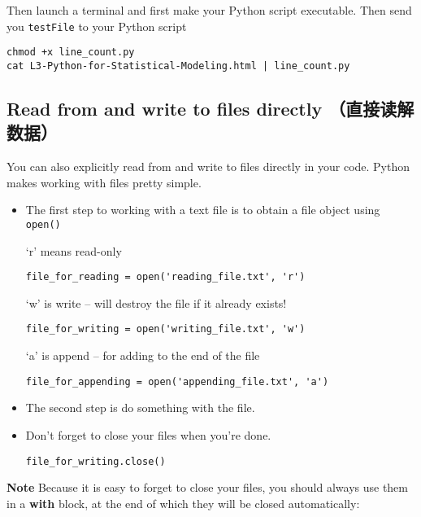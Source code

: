 \documentclass{article}
\begin{document}
    Then launch a terminal and first make your Python script executable.
Then send you \texttt{testFile} to your Python script

\begin{verbatim}
chmod +x line_count.py
cat L3-Python-for-Statistical-Modeling.html | line_count.py
\end{verbatim}

    \subsection{Read from and write to files directly
（直接读解数据）}\label{read-from-and-write-to-files-directly-ux76f4ux63a5ux8bfbux89e3ux6570ux636e}

You can also explicitly read from and write to files directly in your
code. Python makes working with files pretty simple.

    \begin{itemize}
\item
  The first step to working with a text file is to obtain a file object
  using \texttt{open()}

  `r' means read-only

\begin{verbatim}
file_for_reading = open('reading_file.txt', 'r')
\end{verbatim}

  `w' is write -- will destroy the file if it already exists!

\begin{verbatim}
file_for_writing = open('writing_file.txt', 'w')
\end{verbatim}

  `a' is append -- for adding to the end of the file

\begin{verbatim}
file_for_appending = open('appending_file.txt', 'a')
\end{verbatim}
\item
  The second step is do something with the file.
\item
  Don't forget to close your files when you're done.

\begin{verbatim}
file_for_writing.close()
\end{verbatim}
\end{itemize}

\textbf{Note} Because it is easy to forget to close your files, you
should always use them in a \textbf{with} block, at the end of which
they will be closed automatically:
\end{document}
